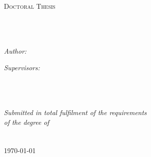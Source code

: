 \documentclass[11pt, oneside]{Thesis} %
\begin{document}
\begin{titlepage}
\begin{center}

\textsc{\LARGE \univname}\\[1.5cm] %
\textsc{\Large Doctoral Thesis}\\[0.5cm] %

\HRule \\[0.4cm]
{\huge \bfseries \ttitle}\\[0.4cm] %
\HRule \\[1.5cm]
 
\begin{minipage}{0.4\textwidth}
\begin{flushleft} \large
\emph{Author:}\\
\href{http://www.ms.unimelb.edu.au/Personnel/profile.php?PC_id=1763}{\authornames} %
\end{flushleft}
\end{minipage}
\begin{minipage}{0.4\textwidth}
\begin{flushright} \large
\emph{Supervisors:} \\%
\href{http://www.ms.unimelb.edu.au/Personnel/profile.php?PC_id=147}{\supnameone} \\ 
\href{http://www.ms.unimelb.edu.au/~aurored/}{\supnametwo}
\\
\href{https://research.monash.edu/en/persons/tim-garoni}{\supnamethree}
\end{flushright}
\end{minipage}\\[3cm]
 
\large \textit{Submitted in total fulfilment of the requirements\\ of the degree of \degreename}\\[0.3cm] %
\groupname\\\deptname\\[2cm] %
 
{\large \today}\\[4cm] %
 
\vfill
\end{center}
\end{titlepage}
\end{document}

